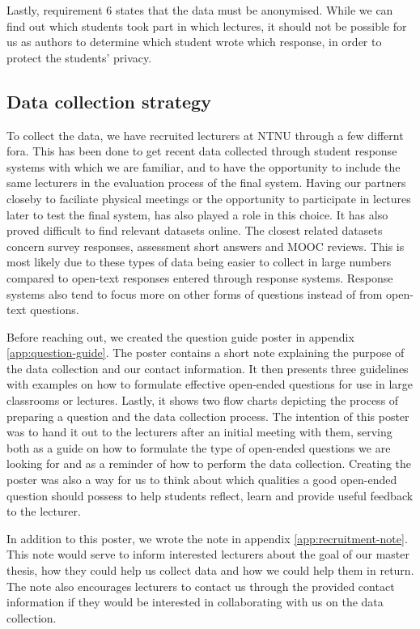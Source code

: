 Lastly, requirement 6 states that the data must be anonymised. While we can find out which students took part in which lectures, it should not be possible for us as authors to determine which student wrote which response, in order to protect the students' privacy.


\subsection{Data collection strategy}\label{sec:data-collection-strategy}
To collect the data, we have recruited lecturers at NTNU through a few differnt fora. This has been done to get recent data collected through student response systems with which we are familiar, and to have the opportunity to include the same lecturers in the evaluation process of the final system. Having our partners closeby to faciliate physical meetings or the opportunity to participate in lectures later to test the final system, has also played a role in this choice. It has also proved difficult to find relevant datasets online. The closest related datasets concern survey responses, assessment short answers and MOOC reviews. This is most likely due to these types of data being easier to collect in large numbers compared to open-text responses entered through response systems. Response systems also tend to focus more on other forms of questions instead of from open-text questions.

Before reaching out, we created the question guide poster in appendix \ref{app:question-guide}. The poster contains a short note explaining the purpose of the data collection and our contact information. It then presents three guidelines with examples on how to formulate effective open-ended questions for use in large classrooms or lectures. Lastly, it shows two flow charts depicting the process of preparing a question and the data collection process. The intention of this poster was to hand it out to the lecturers after an initial meeting with them, serving both as a guide on how to formulate the type of open-ended questions we are looking for and as a reminder of how to perform the data collection. Creating the poster was also a way for us to think about which qualities a good open-ended question should possess to help students reflect, learn and provide useful feedback to the lecturer.

In addition to this poster, we wrote the note in appendix \ref{app:recruitment-note}. This note would serve to inform interested lecturers about the goal of our master thesis, how they could help us collect data and how we could help them in return. The note also encourages lecturers to contact us through the provided contact information if they would be interested in collaborating with us on the data collection.

